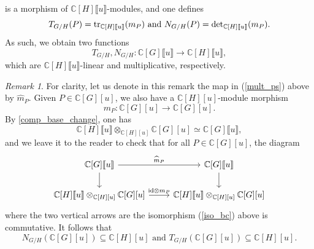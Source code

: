 \documentclass[11pt]{amsart}
\numberwithin{equation}{section}
\theoremstyle{remark}
\newtheorem{remark}[theorem]{Remark}
\theoremstyle{definition}
\begin{document}
is a morphism of $\mathbb{C}[H]\llbracket u \rrbracket$-modules, and one defines
$$T_{G/H}(P) = {\rm tr}_{\mathbb{C}[H]\llbracket u \rrbracket}(m_{P}) \text{ and } N_{G/H}(P) = {\rm det}_{\mathbb{C}[H]\llbracket u \rrbracket}(m_{P}). $$
As such, we obtain two functions 
\begin{equation} \label{t_and_n_ps}
T_{G/H}, N_{G/H}:\mathbb{C}[G]\llbracket u \rrbracket \rightarrow \mathbb{C}[H]\llbracket u \rrbracket, 
\end{equation}
which are $\mathbb{C}[H]\llbracket u \rrbracket$-linear and multiplicative, respectively.  
\begin{remark} \label{base_ch_rem}
For clarity, let us denote in this remark the map in (\ref{mult_ps}) above by $\widehat{m}_{P}$.  Given $P \in \mathbb{C}[G][u]$, we also have a $\mathbb{C}[H][u]$-module morphism 
$$m_{P}:\mathbb{C}[G][u] \rightarrow \mathbb{C}[G][u].$$  
By \cref{comp_base_change}, one has
\begin{equation} \label{iso_bc}
\mathbb{C}[H]\llbracket u \rrbracket \otimes_{\mathbb{C}[H][u]}\mathbb{C}[G][u] \simeq \mathbb{C}[G]\llbracket u \rrbracket,
\end{equation}
and we leave it to the reader to check that for all $P \in \mathbb{C}[G][u]$, the diagram
\begin{equation*}
\begin{tikzcd}
\mathbb{C}[G]\llbracket u \rrbracket \arrow[,d] \arrow["\widehat{m}_{P}",r] & \mathbb{C}[G]\llbracket u \rrbracket \arrow[,d]\\
\mathbb{C}[H]\llbracket u \rrbracket \otimes_{\mathbb{C}[H][u]}\mathbb{C}[G][u] \arrow["{\rm id} \otimes m_{P}",r]  & \mathbb{C}[H]\llbracket u \rrbracket \otimes_{\mathbb{C}[H][u]}\mathbb{C}[G][u]
\end{tikzcd}
\end{equation*}
where the two vertical arrows are the isomorphism (\ref{iso_bc}) above is commutative.  It follows that
$$N_{G/H}(\mathbb{C}[G][u]) \subseteq \mathbb{C}[H][u] \text{ and } T_{G/H}(\mathbb{C}[G][u]) \subseteq \mathbb{C}[H][u].$$
\end{remark}
\end{document}
